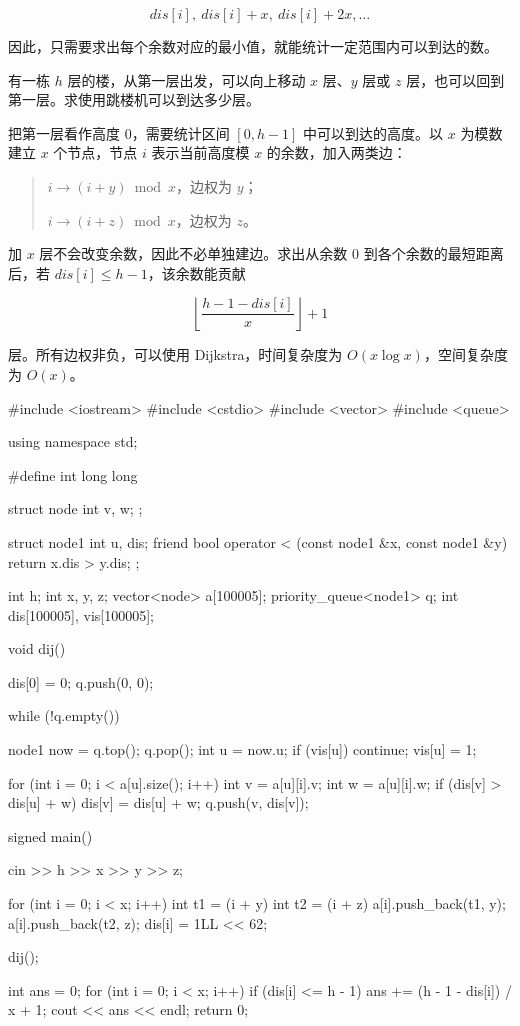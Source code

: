 \documentclass[UTF8,a4paper,11pt]{ctexart}
\newcommand{\topic}[1]{%
  \par\needspace{3\baselineskip}\vspace{0.45em}%
  \noindent{\bfseries\color{Primary}#1}\par\vspace{0.12em}%
}
\begin{document}
\[
dis[i],\ dis[i]+x,\ dis[i]+2x,\ldots
\]

因此，只需要求出每个余数对应的最小值，就能统计一定范围内可以到达的数。

\topic{题目一：跳楼机}

有一栋 $h$ 层的楼，从第一层出发，可以向上移动 $x$ 层、$y$ 层或 $z$ 层，也可以回到第一层。求使用跳楼机可以到达多少层。

把第一层看作高度 $0$，需要统计区间 $[0,h-1]$ 中可以到达的高度。以 $x$ 为模数建立 $x$ 个节点，节点 $i$ 表示当前高度模 $x$ 的余数，加入两类边：

\begin{quote}
$i\to(i+y)\bmod x$，边权为 $y$；\par
$i\to(i+z)\bmod x$，边权为 $z$。
\end{quote}

加 $x$ 层不会改变余数，因此不必单独建边。求出从余数 $0$ 到各个余数的最短距离后，若 $dis[i]\le h-1$，该余数能贡献

\[
\left\lfloor\frac{h-1-dis[i]}{x}\right\rfloor+1
\]

层。所有边权非负，可以使用 Dijkstra，时间复杂度为 $O(x\log x)$，空间复杂度为 $O(x)$。

\begin{CodeBlock}
#include <iostream>
#include <cstdio>
#include <vector>
#include <queue>

using namespace std;

#define int long long

struct node {
    int v, w;
};

struct node1 {
    int u, dis;
    friend bool operator < (const node1 &x, const node1 &y) {
        return x.dis > y.dis;
    }
};

int h;
int x, y, z;
vector<node> a[100005];
priority_queue<node1> q;
int dis[100005], vis[100005];

void dij() {
    dis[0] = 0;
    q.push({0, 0});

    while (!q.empty()) {
        node1 now = q.top();
        q.pop();
        int u = now.u;
        if (vis[u])
            continue;
        vis[u] = 1;

        for (int i = 0; i < a[u].size(); i++) {
            int v = a[u][i].v;
            int w = a[u][i].w;
            if (dis[v] > dis[u] + w) {
                dis[v] = dis[u] + w;
                q.push({v, dis[v]});
            }
        }
    }
}

signed main() {
    cin >> h >> x >> y >> z;

    for (int i = 0; i < x; i++) {
        int t1 = (i + y) %
        int t2 = (i + z) %
        a[i].push_back({t1, y});
        a[i].push_back({t2, z});
        dis[i] = 1LL << 62;
    }

    dij();

    int ans = 0;
    for (int i = 0; i < x; i++) {
        if (dis[i] <= h - 1)
            ans += (h - 1 - dis[i]) / x + 1;
    }
    cout << ans << endl;
    return 0;
}
\end{CodeBlock}
\end{document}
